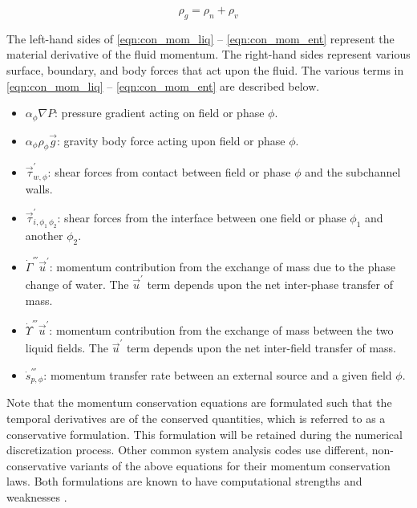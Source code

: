 \begin{equation}
\label{eqn:gaseous_density}
\rho_g = \rho_n + \rho_v
\end{equation}

The left-hand sides of \eqref{eqn:con_mom_liq} -- \eqref{eqn:con_mom_ent} represent the material derivative of the fluid momentum.
The right-hand sides represent various surface, boundary, and body forces that act upon the fluid.
The various terms in \eqref{eqn:con_mom_liq} -- \eqref{eqn:con_mom_ent} are described below.

\begin{itemize}
\item{
$\alpha_{\phi} \nabla P$:
pressure gradient acting on field or phase $\phi$.
}
\item{
$\alpha_{\phi} \rho_{\phi} \vec{g}$:
gravity body force acting upon field or phase $\phi$.
}
\item{
$\vec{\tau}^{'}_{w,\phi}$:
 shear forces from contact between field or phase $\phi$ and the subchannel walls. 
}
\item{
$\vec{\tau}^{'}_{i,\phi_1\,\phi_2}$:
 shear forces from the interface between one field or phase $\phi_1$ and another $\phi_2$. 
}
\item{
$\dot{\Gamma}^{'''}\vec{u}^{'}$:
 momentum contribution from the exchange of mass due to the phase change of water.
 The $\vec{u}^{'}$ term depends upon the net inter-phase transfer of mass.
}
\item{
$\dot{\Upsilon}^{'''}\vec{u}^{'}$:
 momentum contribution from the exchange of mass between the two liquid fields.
 The $\vec{u}^{'}$ term depends upon the net inter-field transfer of mass.
}
\item{
$\dot{s}^{'''}_{p,\phi}$:
 momentum transfer rate between an external source and a given field $\phi$.
}
\end{itemize}

Note that the momentum conservation equations are formulated such that the temporal derivatives are of the conserved quantities, which is referred to as a conservative formulation.
This formulation will be retained during the numerical discretization process.
Other common system analysis codes \cite{TRACE, RELAP} use different, non-conservative variants of the above equations for their momentum conservation laws.
Both formulations are known to have computational strengths and weaknesses \cite{Park2009a}.

